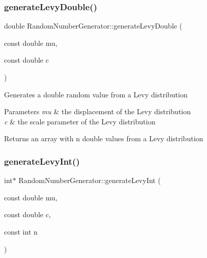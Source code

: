 \subsubsection{\texorpdfstring{generate\+Levy\+Double()}{generateLevyDouble()}\hspace{0.1cm}{\footnotesize\ttfamily [2/2]}}
{\footnotesize\ttfamily double Random\+Number\+Generator\+::generate\+Levy\+Double (\begin{DoxyParamCaption}\item[{const double}]{mu,  }\item[{const double}]{c }\end{DoxyParamCaption})}

Generates a double random value from a Levy distribution 
\begin{DoxyParams}{Parameters}
{\em mu} & the displacement of the Levy distribution \\
\hline
{\em c} & the scale parameter of the Levy distribution \\
\hline
\end{DoxyParams}
\begin{DoxyReturn}{Returns}
an array with n double values from a Levy distribution 
\end{DoxyReturn}
\mbox{\label{class_random_number_generator_a1eb331f894900bc5301dc7007cbedef5}} 
\subsubsection{\texorpdfstring{generate\+Levy\+Int()}{generateLevyInt()}\hspace{0.1cm}{\footnotesize\ttfamily [1/2]}}
{\footnotesize\ttfamily int$\ast$ Random\+Number\+Generator\+::generate\+Levy\+Int (\begin{DoxyParamCaption}\item[{const double}]{mu,  }\item[{const double}]{c,  }\item[{const int}]{n }\end{DoxyParamCaption})}

\mbox{\label{class_random_number_generator_a2388c3148c1785ddba99269b730ec948}} 
